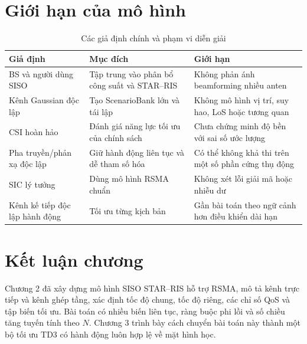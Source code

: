 \section{Giới hạn của mô hình}
\begin{table}[H]
\caption{Các giả định chính và phạm vi diễn giải}
\label{tab:model-assumptions}
\begin{tabularx}{\textwidth}{p{4.1cm}Y Y}
\toprule
\textbf{Giả định} & \textbf{Mục đích} & \textbf{Giới hạn}\tabularnewline
\midrule
BS và người dùng SISO & Tập trung vào phân bổ công suất và STAR--RIS & Không phản ánh beamforming nhiều anten\\
Kênh Gaussian độc lập & Tạo ScenarioBank lớn và tái lập & Không mô hình vị trí, suy hao, LoS hoặc tương quan\\
CSI hoàn hảo & Đánh giá năng lực tối ưu của chính sách & Chưa chứng minh độ bền với sai số ước lượng\\
Pha truyền/phản xạ độc lập & Giữ hành động liên tục và dễ tham số hóa & Có thể không khả thi trên một số phần cứng thụ động\\
SIC lý tưởng & Dùng mô hình RSMA chuẩn & Không xét lỗi giải mã hoặc nhiễu dư\\
Kênh kế tiếp độc lập hành động & Tối ưu từng kịch bản & Gần bài toán theo ngữ cảnh hơn điều khiển dài hạn\\
\bottomrule
\end{tabularx}
\end{table}

\section{Kết luận chương}
Chương 2 đã xây dựng mô hình SISO STAR--RIS hỗ trợ RSMA, mô tả kênh trực tiếp và kênh ghép tầng, xác định tốc độ chung, tốc độ riêng, các chỉ số QoS và tập biến tối ưu. Bài toán có nhiều biến liên tục, ràng buộc phi lồi và số chiều tăng tuyến tính theo $N$. Chương 3 trình bày cách chuyển bài toán này thành một bộ tối ưu TD3 có hành động luôn hợp lệ về mặt hình học.
